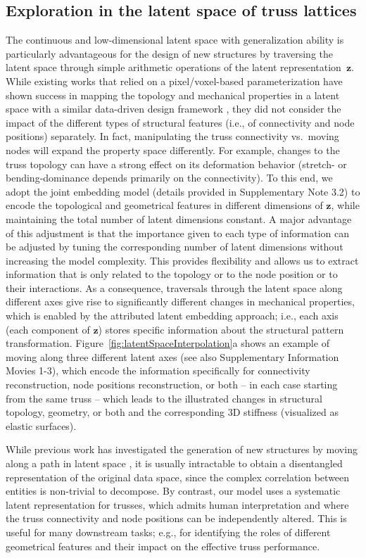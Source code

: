 \documentclass[fleqn,10pt]{wlscirep}
\newcommand{\boldface}[1]{\boldsymbol{#1}}
\newcommand{\bfz}{\boldface{z}}
\renewcommand{\figurename}{Figure}
\begin{document}
\subsection*{Exploration in the latent space of truss lattices}
The continuous and low-dimensional latent space with generalization ability is particularly advantageous for the design of new structures by traversing the latent space through simple arithmetic operations of the latent representation~$\bfz$. While existing works that relied on a pixel/voxel-based parameterization have shown success in mapping the topology and mechanical properties in a latent space with a similar data-driven design framework \cite{wang2020deep}, they did not consider the impact of the different types of structural features (i.e., of connectivity and node positions) separately. In fact, manipulating the truss connectivity vs.\ moving nodes will expand the property space differently. For example, changes to the truss topology can have a strong effect on its deformation behavior (stretch- or bending-dominance depends primarily on the connectivity\cite{DeshpandeEtAl2001}). To this end, we adopt the joint embedding model (details provided in Supplementary Note 3.2) to encode the topological and geometrical features in different dimensions of $\bfz$, while maintaining the total number of latent dimensions constant. A major advantage of this adjustment is that the importance given to each type of information can be adjusted by tuning the corresponding number of latent dimensions without increasing the model complexity. This provides flexibility and allows us to extract information that is only related to the topology or to the node position or to their interactions. 
As a consequence, traversals through the latent space along different axes give rise to significantly different changes in mechanical properties, which is enabled by the attributed latent embedding approach; i.e., each axis (each component of $\bfz$) stores specific information about the structural pattern transformation. \figurename~\ref{fig:latentSpaceInterpolation}a shows an example of moving along three different latent axes (see also Supplementary Information Movies 1-3), which encode the information specifically for connectivity reconstruction, node positions reconstruction, or both -- in each case starting from the same truss -- which leads to the illustrated changes in structural topology, geometry, or both and the corresponding 3D stiffness (visualized as elastic surfaces).

While previous work has investigated the generation of new structures by moving along a path in latent space \cite{wang2020deep, gomez2018automatic}, it is usually intractable to obtain a disentangled representation of the original data space, since the complex correlation between entities is non-trivial to decompose. By contrast, our model uses a systematic latent representation for trusses, which admits human interpretation and where the truss connectivity and node positions can be independently altered. This is useful for many downstream tasks; e.g., for identifying the roles of different geometrical features and their impact on the effective truss performance.
\end{document}
